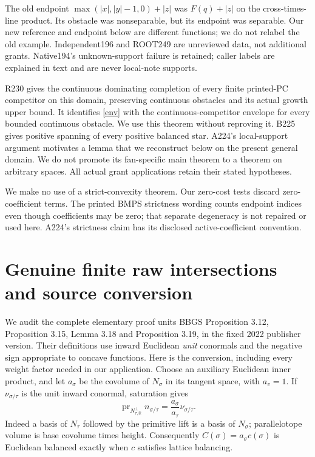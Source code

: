 \documentclass[11pt]{article}
\newcommand{\R}{\mathbb R}
\begin{document}
The old endpoint $\max(|x|,|y|-1,0)+|z|$ was $F(q)+|z|$ on the
cross-times-line product. Its obstacle was nonseparable, but its endpoint
was separable. Our new reference and endpoint below are different functions;
we do not relabel the old example. Independent196 and ROOT249 are unreviewed
data, not additional grants. Native194's unknown-support failure is retained;
caller labels are explained in text and are never local-note supports.

R230 gives the continuous dominating completion of every finite printed-PC
competitor on this domain, preserving continuous obstacles and its actual
growth upper bound. It identifies \eqref{env} with the continuous-competitor
envelope for every bounded continuous obstacle. We use this theorem without
reproving it. B225 gives positive spanning of every positive balanced star.
A224's local-support argument motivates a lemma that we reconstruct below
on the present general domain. We do not promote its fan-specific main
theorem to a theorem on arbitrary spaces. All actual grant applications
retain their stated hypotheses.

We make no use of a strict-convexity theorem. Our zero-cost tests discard
zero-coefficient terms. The printed BMPS strictness wording counts endpoint
indices even though coefficients may be zero; that separate degeneracy is
not repaired or used here. A224's strictness claim has its disclosed
active-coefficient convention.

\section{Genuine finite raw intersections and source conversion}
We audit the complete elementary proof units BBGS Proposition 3.12,
Proposition 3.15, Lemma 3.18 and Proposition 3.19, in the fixed 2022
publisher version. Their definitions use inward Euclidean \emph{unit}
conormals and the negative sign appropriate to concave functions. Here is
the conversion, including every weight factor needed in our application.
Choose an auxiliary Euclidean inner product, and let \(a_\sigma\) be
the covolume of \(N_\sigma\) in its tangent space, with \(a_v=1\).
If \(\nu_{\sigma/\tau}\) is the unit inward conormal, saturation gives
\begin{equation}\label{height}
 \operatorname{pr}_{N_{\tau,\R}^{\perp}}n_{\sigma/\tau}
   =\frac{a_\sigma}{a_\tau}\nu_{\sigma/\tau}.
\end{equation}
Indeed a basis of \(N_\tau\) followed by the primitive lift is a basis of
\(N_\sigma\); parallelotope volume is base covolume times height.
Consequently \(C(\sigma)=a_\sigma c(\sigma)\) is Euclidean balanced exactly
when \(c\) satisfies lattice balancing.
\end{document}
